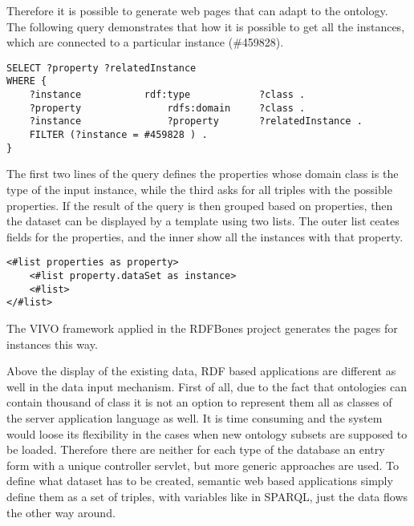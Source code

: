
Therefore it is possible to generate web pages that can adapt to the ontology. The following query demonstrates that how it is possible to get all the instances, which are connected to a particular instance (\#459828).

\begin{lstlisting}[captionpos=b, caption= Dynamic SPARQL query, label=skullJSON, belowskip=1em, aboveskip=2em,
basicstyle=\footnotesize,frame=single]
SELECT ?property ?relatedInstance
WHERE {
	?instance 			rdf:type  			?class .  
	?property				rdfs:domain		?class .
	?instance				?property 		?relatedInstance .
	FILTER (?instance = #459828 ) .
}
\end{lstlisting}

The first two lines of the query defines the properties whose domain class is the type of the input instance, while the third asks for all triples with the possible properties. If the result of the query is then grouped based on properties, then the dataset can be displayed by a template using two lists. The outer list ceates fields for the properties, and the inner show all the instances with that property.


\begin{lstlisting}[captionpos=b, caption=Ontology adaptive template file, label=template,
basicstyle=\footnotesize,frame=single]
<#list properties as property>
	<#list property.dataSet as instance> 
	<#list> 
</#list>
\end{lstlisting}

The VIVO framework applied in the RDFBones project generates the pages for instances this way.


Above the display of the existing data, RDF based applications are different as well in the data input mechanism. First of all, due to the fact that ontologies can contain thousand of class it is not an option to represent them all as classes of the server application language as well. It is time consuming and the system would loose its flexibility in the cases when new ontology subsets are supposed to be loaded. Therefore there are neither for each type of the database an entry form with a unique controller servlet, but more generic approaches are used.
To define what dataset has to be created, semantic web based applications simply define them as a set of triples, with variables like in SPARQL, just the data flows the other way around.


